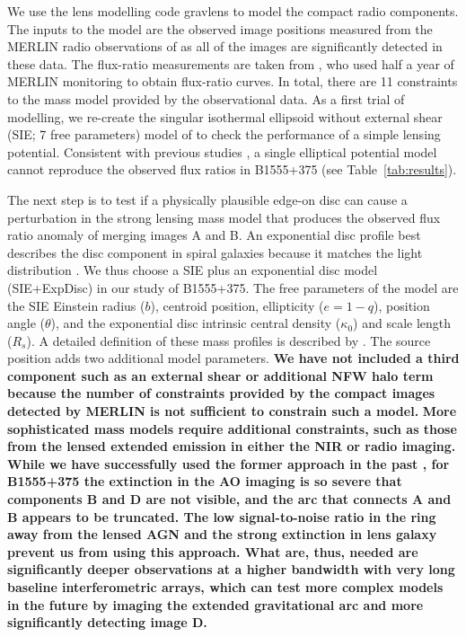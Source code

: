 \documentclass[a4paper,fleqn,usenatbib,useAMS]{mnras}
\begin{document}
We use the lens modelling code {\sc gravlens} \citep{Kee01} to model the compact radio components. The inputs to the model are the observed image positions measured from the MERLIN radio observations of \citet{Marlow99} as all of the images are significantly detected in these data. The flux-ratio measurements are taken from \citet{K03}, who used half a year of MERLIN monitoring to obtain flux-ratio curves. In total, there are 11 constraints to the mass model provided by the observational data. As a first trial of modelling, we re-create the singular isothermal ellipsoid without external shear (SIE; 7 free parameters) model of \citet{Marlow99} to check the performance of a simple lensing potential. Consistent with previous studies \citep{Marlow99,Xu15}, a single elliptical potential model cannot reproduce the observed flux ratios in B1555+375 (see Table~\ref{tab:results}). 

The next step is to test if a physically plausible edge-on disc can cause a perturbation in the strong lensing mass model that produces the observed flux ratio anomaly of  merging images A and B. An exponential disc profile best describes the disc component in spiral galaxies because it matches the light distribution \citep{Kee98}. We thus choose a SIE plus an exponential disc model (SIE+ExpDisc) in our study of B1555+375. The free parameters of the model are the SIE Einstein radius ($b$), centroid position, ellipticity ($e = 1 - q$), position angle ($\theta$), and the exponential disc intrinsic central density ($\kappa_0$) and scale length ($R_s$). A detailed definition of these mass profiles is described by \citet{Kee01}. The source position adds two additional model parameters. {\bf We have not included a third component such as an external shear or additional NFW halo term because the number of constraints provided by the compact images detected by MERLIN is not sufficient to constrain such a model.} 
{\bf 
More sophisticated mass models require additional
constraints, such as those from the lensed extended emission in either
the NIR or radio imaging.  While we have successfully used the former
approach in the past \citep[e.g.][]{V12}, for B1555+375 the extinction
in the AO imaging is so severe that components B and D are not
visible, and the arc that connects A and B appears to be truncated.
The low signal-to-noise ratio in the ring away from the lensed AGN and
the strong extinction in lens galaxy prevent us from using this
approach.  What are, thus, needed are significantly deeper
observations at a higher bandwidth with very long baseline
interferometric arrays, which can test more complex models in the
future by imaging the extended gravitational arc and more
significantly detecting image D. }
\end{document}
